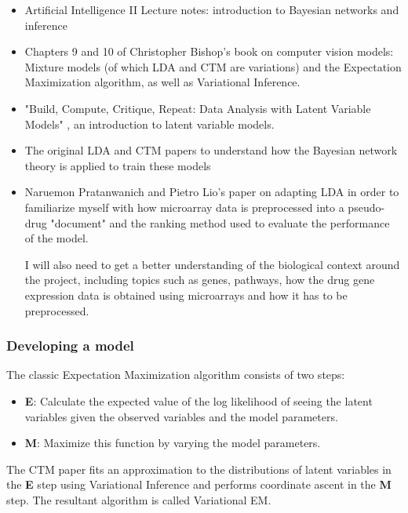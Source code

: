\documentclass[12pt,a4]{article}
\begin{document}
\begin{itemize}
\item Artificial Intelligence II Lecture notes: introduction to Bayesian networks and inference
\item Chapters 9 and 10 of Christopher Bishop's book\cite{Bishop:2006:PRM:1162264} on computer vision models: Mixture models (of which LDA and CTM are variations) and the Expectation Maximization algorithm, as well as Variational Inference.
\item "Build, Compute, Critique, Repeat: Data Analysis with Latent Variable Models"\cite{doi:10.1146/annurev-statistics-022513-115657} , an introduction to latent variable models.
\item The original LDA\cite{Blei} and CTM\cite{2007} papers to understand how the Bayesian network theory is applied to train these models
\item Naruemon Pratanwanich and Pietro Lio's paper\cite{Pratanwanich2014}  on adapting LDA in order to familiarize myself with how microarray data is preprocessed into a pseudo-drug "document" and the ranking method used to evaluate the performance of the model.

I will also need to get a better understanding of the biological context around the project, including topics such as genes, pathways, how the drug gene expression data is obtained using microarrays and how it has to be preprocessed.

\end{itemize}

\subsubsection*{Developing a model}

The classic Expectation Maximization algorithm consists of two steps:

\begin{itemize}
\item \textbf{E}: Calculate the expected value of the log likelihood of seeing the latent variables given the observed variables and the model parameters.
\item \textbf{M}: Maximize this function by varying the model parameters.
\end{itemize}

The CTM paper\cite{2007} fits an approximation to the distributions of latent variables in the \textbf{E} step using Variational Inference and performs coordinate ascent in the \textbf{M} step. The resultant algorithm is called Variational EM.
\end{document}
